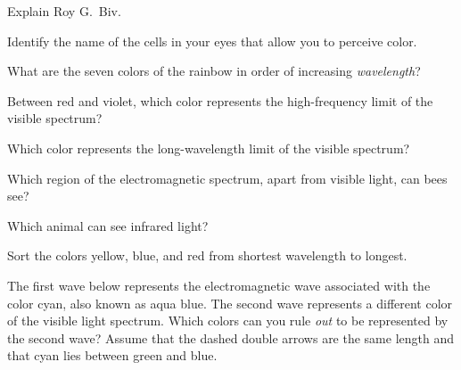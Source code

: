 \documentclass[../main-physics-problems.tex]{subfiles}
\begin{document}
\begin{questions}


\question
Explain Roy G.~Biv.


\question
Identify the name of the cells in your eyes that allow you to perceive color.


\question
What are the seven colors of the rainbow in order of increasing \textit{wavelength}?


\question
Between red and violet, which color represents the high-frequency limit of the visible spectrum?


\question
Which color represents the long-wavelength limit of the visible spectrum?


\question
Which region of the electromagnetic spectrum, apart from visible light, can bees see?


\question
Which animal can see infrared light?


\question \label{lwLSKO}
Sort the colors yellow, blue, and red from shortest wavelength to longest.


\question
The first wave below represents the electromagnetic wave associated with the color cyan, also known as aqua blue. The second wave represents a different color of the visible light spectrum. Which colors can you rule \textit{out} to be represented by the second wave? Assume that the dashed double arrows are the same length and that cyan lies between green and blue.


\begin{center}

\vspace{1em}


\end{center}
\end{questions}
\end{document}
